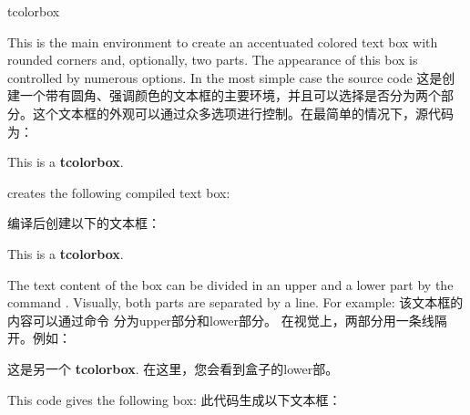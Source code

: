 \begin{docEnvironment}{tcolorbox}{}
\begin{stripedbox}
This is the main environment to create an accentuated colored text box with
rounded corners and, optionally, two parts. The appearance of this box
is controlled by numerous options.
In the most simple case the source code
\tcblower
这是创建一个带有圆角、强调颜色的文本框的主要环境，并且可以选择是否分为两个部分。这个文本框的外观可以通过众多选项进行控制。在最简单的情况下，源代码为：
\end{stripedbox}

\begin{dispListing}
\begin{tcolorbox}
This is a \textbf{tcolorbox}.
\end{tcolorbox}
\end{dispListing}

creates the following compiled text box:

编译后创建以下的文本框：%

\begin{tcolorbox}
This is a \textbf{tcolorbox}.
\end{tcolorbox}

\begin{stripedbox}
The text content of the box can be divided
in an upper and a lower part
by the command . Visually, both parts are separated by a line.
For example:
\tcblower
该文本框的内容可以通过命令  分为upper部分和lower部分。 在视觉上，两部分用一条线隔开。例如：
\end{stripedbox}

\begin{dispListing}
\begin{tcolorbox}
这是另一个 \textbf{tcolorbox}.
\tcblower
在这里，您会看到盒子的lower部。
\end{tcolorbox}
\end{dispListing}

\begin{stripedbox}
This code gives the following box:
\tcblower
此代码生成以下文本框：
\end{stripedbox}


\end{docEnvironment}
